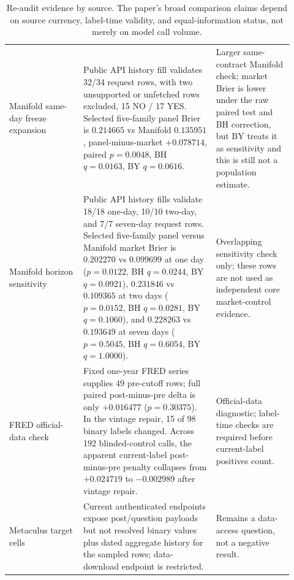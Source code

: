 \documentclass[11pt]{article}
\begin{document}
\begin{table}[htbp]
\begin{tabular}{L{0.24\linewidth} L{0.43\linewidth} L{0.25\linewidth}}
Manifold same-day freeze expansion & Public API history fill validates 32/34 request rows, with two unsupported or unfetched rows excluded, 15 NO / 17 YES. Selected five-family panel Brier is $0.214665$ vs Manifold $0.135951$, panel-minus-market $+0.078714$, paired $p=0.0048$, BH $q=0.0163$, BY $q=0.0616$. & Larger same-contract Manifold check; market Brier is lower under the raw paired test and BH correction, but BY treats it as sensitivity and this is still not a population estimate. \\
Manifold horizon sensitivity & Public API history fills validate 18/18 one-day, 10/10 two-day, and 7/7 seven-day request rows. Selected five-family panel versus Manifold market Brier is $0.202270$ vs $0.099699$ at one day ($p=0.0122$, BH $q=0.0244$, BY $q=0.0921$), $0.231846$ vs $0.109365$ at two days ($p=0.0152$, BH $q=0.0281$, BY $q=0.1060$), and $0.228263$ vs $0.193649$ at seven days ($p=0.5045$, BH $q=0.6054$, BY $q=1.0000$). & Overlapping sensitivity check only; these rows are not used as independent core market-control evidence. \\
FRED official-data check & Fixed one-year FRED series supplies 49 pre-cutoff rows; full paired post-minus-pre delta is only $+0.016477$ ($p=0.30375$). In the vintage repair, 15 of 98 binary labels changed. Across 192 blinded-control calls, the apparent current-label post-minus-pre penalty collapses from $+0.024719$ to $-0.002989$ after vintage repair. & Official-data diagnostic; label-time checks are required before current-label positives count. \\
Metaculus target cells & Current authenticated endpoints expose post/question payloads but not resolved binary values plus dated aggregate history for the sampled rows; data-download endpoint is restricted. & Remains a data-access question, not a negative result. \\
\bottomrule
\end{tabular}
\caption{Re-audit evidence by source. The paper's broad comparison claims depend on source currency, label-time validity, and equal-information status, not merely on model call volume.}
\label{tab:reaudit-sources}
\endgroup
\end{table}
\end{document}
